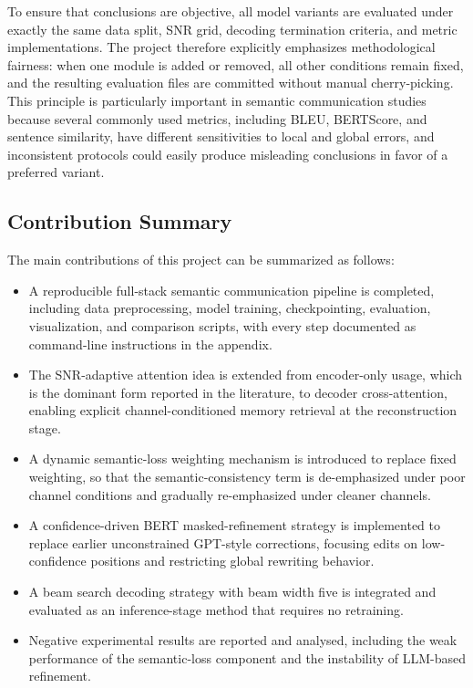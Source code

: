 To ensure that conclusions are objective, all model variants are evaluated under exactly the same data split, SNR grid, decoding termination criteria, and metric implementations. The project therefore explicitly emphasizes methodological fairness: when one module is added or removed, all other conditions remain fixed, and the resulting evaluation files are committed without manual cherry-picking. This principle is particularly important in semantic communication studies because several commonly used metrics, including BLEU, BERTScore, and sentence similarity, have different sensitivities to local and global errors, and inconsistent protocols could easily produce misleading conclusions in favor of a preferred variant.

\subsection{Contribution Summary}

The main contributions of this project can be summarized as follows:

\begin{itemize}
    \item A reproducible full-stack semantic communication pipeline is completed, including data preprocessing, model training, checkpointing, evaluation, visualization, and comparison scripts, with every step documented as command-line instructions in the appendix.
    \item The SNR-adaptive attention idea is extended from encoder-only usage, which is the dominant form reported in the literature, to decoder cross-attention, enabling explicit channel-conditioned memory retrieval at the reconstruction stage.
    \item A dynamic semantic-loss weighting mechanism is introduced to replace fixed weighting, so that the semantic-consistency term is de-emphasized under poor channel conditions and gradually re-emphasized under cleaner channels.
    \item A confidence-driven BERT masked-refinement strategy is implemented to replace earlier unconstrained GPT-style corrections, focusing edits on low-confidence positions and restricting global rewriting behavior.
    \item A beam search decoding strategy with beam width five is integrated and evaluated as an inference-stage method that requires no retraining.
    \item Negative experimental results are reported and analysed, including the weak performance of the semantic-loss component and the instability of LLM-based refinement.
\end{itemize}

